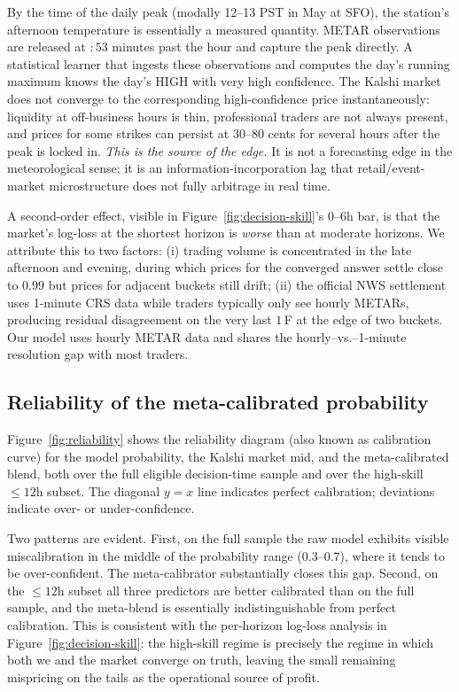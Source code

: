 \documentclass[11pt]{article}
\begin{document}
By the time of the daily peak (modally 12--13 PST in May at SFO), the
station's afternoon temperature is essentially a measured quantity. METAR
observations are released at $:53$ minutes past the hour and capture the
peak directly. A statistical learner that ingests these observations and
computes the day's running maximum knows the day's HIGH with very high
confidence. The Kalshi market does not converge to the corresponding
high-confidence price instantaneously: liquidity at off-business hours is
thin, professional traders are not always present, and prices for some
strikes can persist at $30$--$80$ cents for several hours after the peak
is locked in. \emph{This is the source of the edge.} It is not a
forecasting edge in the meteorological sense; it is an information-incorporation
lag that retail/event-market microstructure does not fully arbitrage in
real time.

A second-order effect, visible in Figure~\ref{fig:decision-skill}'s
$0$--$6$h bar, is that the market's log-loss at the shortest horizon is
\emph{worse} than at moderate horizons. We attribute this to two factors:
(i) trading volume is concentrated in the late afternoon and evening,
during which prices for the converged answer settle close to $0.99$ but
prices for adjacent buckets still drift; (ii) the official NWS settlement
uses 1-minute CRS data while traders typically only see hourly METARs,
producing residual disagreement on the very last $1$\,\textdegree F at the
edge of two buckets. Our model uses hourly METAR data and shares the
hourly--vs.--1-minute resolution gap with most traders.

\subsection{Reliability of the meta-calibrated probability}

Figure~\ref{fig:reliability} shows the reliability diagram (also known as
calibration curve) for the model probability, the Kalshi market mid, and
the meta-calibrated blend, both over the full eligible decision-time
sample and over the high-skill $\le 12$h subset. The diagonal $y = x$ line
indicates perfect calibration; deviations indicate over- or under-confidence.

Two patterns are evident. First, on the full sample the raw model
exhibits visible miscalibration in the middle of the probability range
($0.3$--$0.7$), where it tends to be over-confident. The meta-calibrator
substantially closes this gap. Second, on the $\le 12$h subset all three
predictors are better calibrated than on the full sample, and the
meta-blend is essentially indistinguishable from perfect calibration.
This is consistent with the per-horizon log-loss analysis in
Figure~\ref{fig:decision-skill}: the high-skill regime is precisely the
regime in which both we and the market converge on truth, leaving the
small remaining mispricing on the tails as the operational source of
profit.
\end{document}
